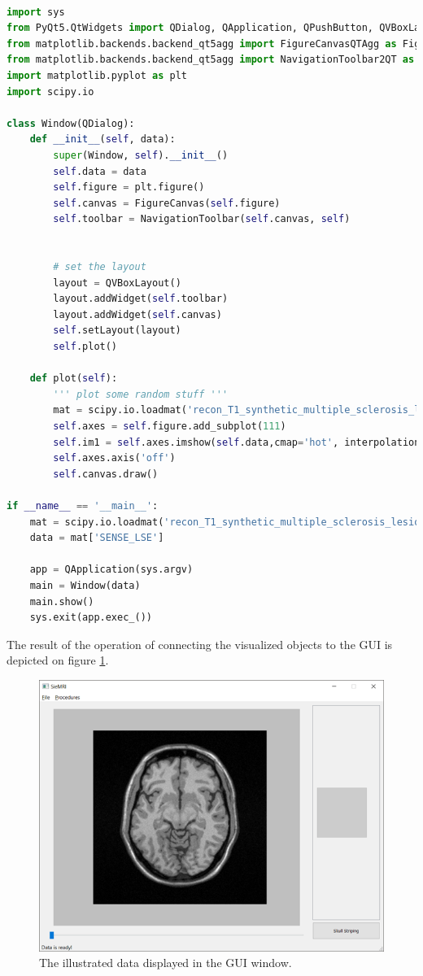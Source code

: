 \begin{lstlisting}[language=Python, caption = Visualisation code connected with QT.]

import sys
from PyQt5.QtWidgets import QDialog, QApplication, QPushButton, QVBoxLayout
from matplotlib.backends.backend_qt5agg import FigureCanvasQTAgg as FigureCanvas
from matplotlib.backends.backend_qt5agg import NavigationToolbar2QT as NavigationToolbar
import matplotlib.pyplot as plt
import scipy.io

class Window(QDialog):
    def __init__(self, data):
        super(Window, self).__init__()
        self.data = data
        self.figure = plt.figure()
        self.canvas = FigureCanvas(self.figure)
        self.toolbar = NavigationToolbar(self.canvas, self)


        # set the layout
        layout = QVBoxLayout()
        layout.addWidget(self.toolbar)
        layout.addWidget(self.canvas)
        self.setLayout(layout)
        self.plot()

    def plot(self):
        ''' plot some random stuff '''
        mat = scipy.io.loadmat('recon_T1_synthetic_multiple_sclerosis_lesions_1mm_L16_r2.mat')
        self.axes = self.figure.add_subplot(111)               
        self.im1 = self.axes.imshow(self.data,cmap='hot', interpolation='nearest') 
        self.axes.axis('off')
        self.canvas.draw()

if __name__ == '__main__':
    mat = scipy.io.loadmat('recon_T1_synthetic_multiple_sclerosis_lesions_1mm_L16_r2.mat')
    data = mat['SENSE_LSE']

    app = QApplication(sys.argv)
    main = Window(data)
    main.show()
    sys.exit(app.exec_())

\end{lstlisting}

The result of the operation of connecting the visualized objects to the GUI is depicted on figure \ref{Fig:vis4}.



\begin{figure}
\centering
\includegraphics[scale=0.7]{figures/vis4}

\caption[Threads scheme]{\label{Fig:vis4}The illustrated data displayed in the GUI window.}
\end{figure}